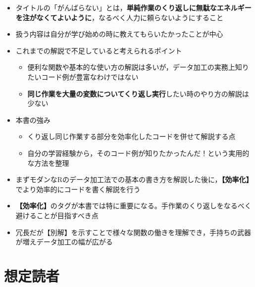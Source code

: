 \documentclass[
  xelatex,ja=standard, b5paper]{bxjsbook}
\providecommand{\tightlist}{%
  \setlength{\itemsep}{0pt}\setlength{\parskip}{0pt}}
\begin{document}
\begin{itemize}
\tightlist
\item
  タイトルの「がんばらない」とは，\textbf{単純作業のくり返しに無駄なエネルギーを注がなくてよいように}，なるべく人力に頼らないようにすること
\item
  扱う内容は自分が学び始めの時に教えてもらいたかったことが中心
\item
  これまでの解説で不足していると考えられるポイント

  \begin{itemize}
  \tightlist
  \item
    便利な関数や基本的な使い方の解説は多いが，データ加工の実務上知りたいコード例が豊富なわけではない
  \item
    \textbf{同じ作業を大量の変数についてくり返し実行}したい時のやり方の解説は少ない
  \end{itemize}
\item
  本書の強み

  \begin{itemize}
  \tightlist
  \item
    くり返し同じ作業する部分を効率化したコードを併せて解説する点
  \item
    自分の学習経験から，そのコード例が知りたかったんだ！という実用的な方法を整理
  \end{itemize}
\item
  まずモダンなRのデータ加工法での基本の書き方を解説した後に，\textbf{【効率化】}でより効率的にコードを書く解説を行う
\item
  \textbf{【効率化】}のタグが本書では特に重要になる。手作業のくり返しをなるべく避けることが目指すべき点
\item
  冗長だが【別解】を示すことで様々な関数の働きを理解でき，手持ちの武器が増えデータ加工の幅が広がる
\end{itemize}

\hypertarget{ux60f3ux5b9aux8aadux8005}{%
\section*{想定読者}\label{ux60f3ux5b9aux8aadux8005}}
\end{document}
